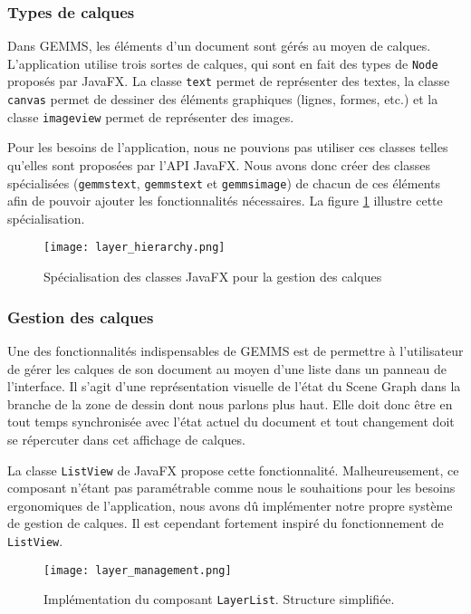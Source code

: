 \subsubsection{Types de calques}
Dans GEMMS, les éléments d'un document sont gérés au moyen de calques. L'application utilise trois sortes de calques, qui sont en fait des types de \texttt{Node} proposés par JavaFX. La classe \texttt{\gls{text}} permet de représenter des textes, la classe \texttt{\gls{canvas}} permet de dessiner des éléments graphiques (lignes, formes, etc.) et la classe \texttt{\gls{imageview}} permet de représenter des images. 

Pour les besoins de l'application, nous ne pouvions pas utiliser ces classes telles qu'elles sont proposées par l'API JavaFX. Nous avons donc créer des classes spécialisées (\texttt{\gls{gemmstext}}, \texttt{\gls{gemmstext}} et  \texttt{\gls{gemmsimage}}) de chacun de ces éléments afin de pouvoir ajouter les fonctionnalités nécessaires. La figure \ref{fig:layer_hierarchy} illustre cette spécialisation.

\begin{figure}[!ht]
	\caption{Spécialisation des classes JavaFX pour la gestion des calques}
	\centering
	\texttt{[image: layer\_hierarchy.png]}
	\label{fig:layer_hierarchy}
\end{figure}


\subsubsection{Gestion des calques}

Une des fonctionnalités indispensables de GEMMS est de permettre à l'utilisateur de gérer les calques de son document au moyen d'une liste dans un panneau de l'interface. Il s'agit d'une représentation visuelle de l'état du Scene Graph dans la branche de la zone de dessin dont nous parlons plus haut. Elle doit donc être en tout temps synchronisée avec l'état actuel du document et tout changement doit se répercuter dans cet affichage de calques.

La classe \texttt{ListView} de JavaFX propose cette fonctionnalité. Malheureusement, ce composant n'étant pas paramétrable comme nous le souhaitions pour les besoins ergonomiques de l'application, nous avons dû implémenter notre propre système de gestion de calques. Il est cependant fortement inspiré du fonctionnement de \texttt{ListView}.

\begin{figure}[!ht]
	\caption{Implémentation du composant \texttt{LayerList}. Structure simplifiée.}
	\centering
	\texttt{[image: layer\_management.png]}
	\label{fig:layer_management}
\end{figure}

